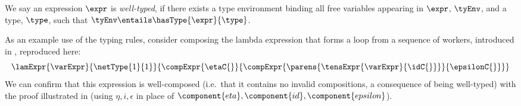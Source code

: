 We say an expression $\expr$ is \emph{well-typed}, if there exists a type
environment binding all free variables appearing in $\expr$, $\tyEnv$, and a
type, $\type$, such that $\tyEnv \entails \hasType{\expr}{\type}$.

As an example use of the typing rules, consider composing the lambda expression
that forms a loop from a sequence of workers, introduced in
, reproduced here:
\[
    \lamExpr{\varExpr}{\netType{1}{1}}
        {\compExpr{\etaC{}}
                  {\compExpr{\parens{\tensExpr{\varExpr}{\idC{}}}}
                            {\epsilonC{}}}}
\]
We can confirm that this expression is well-composed (i.e.\ that it contains no
invalid compositions, a consequence of being well-typed) with the proof
illustrated in  (using $\eta,i,\epsilon$ in place of
$\component{eta},\component{id},\component{epsilon}$).
